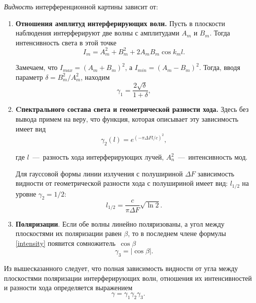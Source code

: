 \documentclass{MagicLabs}
\begin{document}
\textit{Видность }интерференционной картины  зависит от:
\begin{enumerate}
	\item \textbf{Отношения амплитуд интерферирующих волн.}
	Пусть в плоскости наблюдения интерферируют 
	две волны с амплитудами $ A_m $ и $ B_m $. Тогда интенсивность света в этой точке
	\begin{equation}\label{intensity}
	I_m = A^2_m + B^2_m + 2A_mB_m\cos{k_ml}.
	\end{equation}
	
	Замечаем, что $ I_{max} = (A_m + B_m)^2 $, а $ I_{min} = (A_m - B_m)^2 $.
	 Тогда, вводя параметр $  \delta = B_m^2/A_m^2 $, находим
	\begin{equation}\label{visibility1}
		\gamma_1 = \dfrac{2\sqrt{\delta}}{1 + \delta},
	\end{equation}	
	
	\item \textbf{Cпектрального состава света и геометрической разности хода.} 
	Здесь без вывода примем на веру, что функция,
	которая описывает эту зависимость имеет вид
	\begin{equation}\label{visibility2}
		\gamma_2(l) = e^{(-\pi\Delta Fl/c)^2},
	\end{equation}
	
	где $ l $~---~разность хода интерферирующих лучей, $ A_n^2 $~---~интенсивность мод.
	
	Для гауссовой формы линии излучения с полушириной $ \Delta F $ 
	зависимость видности от геометрической разности хода с полушириной имеет вид:
	$ l_{1/2} $ на уровне $ \gamma_2 = 1/2 $:
	\begin{equation}\label{l_1/2}
		l_{1/2} = \dfrac{c}{\pi\Delta F}\sqrt{\ln 2}.
	\end{equation}
	\item \textbf{Поляризации}. Если обе волны линейно поляризованы, а угол между 
	плоскостями их поляризации равен $ \beta $, то в последнем члене формулы 
	\eqref{intensity} появится сомножитель~$ \cos\beta $
	\begin{equation}\label{visibility3}
		\gamma_3 = |\cos\beta|.
	\end{equation}
\end{enumerate}


Из вышесказанного следует, что полная зависимость видности от угла между плоскостями поляризации интерферирующих волн, отношения их интенсивностей и разности хода определяется выражением
\begin{equation}\label{visibility}
	\gamma = \gamma_1\gamma_2\gamma_3.
\end{equation}
\newpage
\end{document}
